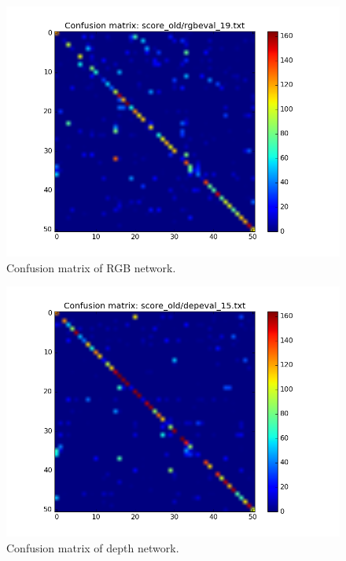 \begin{figure}
	\centering
	\includegraphics[trim={2cm 1cm 2.5cm 1.5cm}, clip, width=\linewidth]{images/rgb_t1_54_t5_77}
	\caption{Confusion matrix of RGB network.}
	\label{fig:rgb_confusion}
\end{figure}

\begin{figure}
	\centering
	\includegraphics[trim={2cm 1cm 2.5cm 1.5cm}, clip, width=\linewidth]{images/dep_t1_71_t5_89}
	\caption{Confusion matrix of depth network.}
	\label{fig:dep_confusion}
\end{figure}


